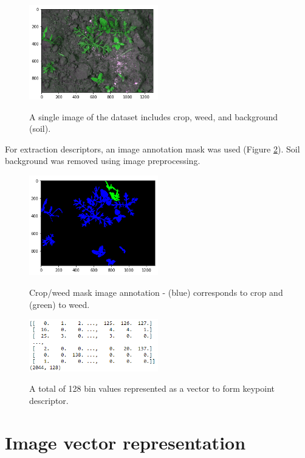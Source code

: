 \documentclass[12pt]{article}
\numberwithin{equation}{section}
\numberwithin{table}{section}
\numberwithin{figure}{section}
\begin{document}
\begin{figure}[H] \centering
	\caption{A single image of the dataset includes crop, weed, and background (soil). }
	\includegraphics[width=0.5\textwidth]{plant.png}
	\label{plant}
\end{figure}

\noindent
For extraction descriptors, an image annotation mask was used (Figure \ref{mask}). Soil background was removed using image preprocessing.

\begin{figure}[H] \centering
	\caption{Crop/weed mask image annotation - (blue) corresponds to crop and (green) to weed. }
	\includegraphics[width=0.5\textwidth]{mask.png}
	\label{mask}
\end{figure}


\begin{figure}[H] \centering
	\caption{A total of 128 bin values represented as a vector to form keypoint descriptor. }
	\includegraphics[width=0.5\textwidth]{sift1.png}
	\label{sit1}
\end{figure}







\section{Image vector representation}
\end{document}
